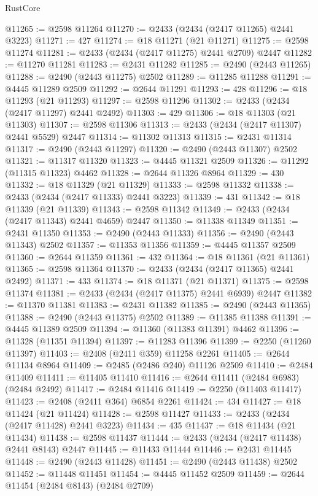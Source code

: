 \begin{lexlean}{RustCore}
\begin{coremodule}
@11265 := @2598 @11264
@11270 := @2433 (@2434 (@2417 @11265) @2441 @3223)
@11271 := 427
@11274 := @18 @11271 (@21 @11271)
@11275 := @2598 @11274
@11281 := @2433 (@2434 (@2417 @11275) @2441 @2709) @2447
@11282 := @11270 @11281
@11283 := @2431 @11282
@11285 := @2490 (@2443 @11265)
@11288 := @2490 (@2443 @11275) @2502
@11289 := @11285 @11288
@11291 := @4445 @11289 @2509
@11292 := @2644 @11291
@11293 := 428
@11296 := @18 @11293 (@21 @11293)
@11297 := @2598 @11296
@11302 := @2433 (@2434 (@2417 @11297) @2441 @2492)
@11303 := 429
@11306 := @18 @11303 (@21 @11303)
@11307 := @2598 @11306
@11313 := @2433 (@2434 (@2417 @11307) @2441 @5529) @2447
@11314 := @11302 @11313
@11315 := @2431 @11314
@11317 := @2490 (@2443 @11297)
@11320 := @2490 (@2443 @11307) @2502
@11321 := @11317 @11320
@11323 := @4445 @11321 @2509
@11326 := @11292 (@11315 @11323) @4462
@11328 := @2644 @11326 @8964
@11329 := 430
@11332 := @18 @11329 (@21 @11329)
@11333 := @2598 @11332
@11338 := @2433 (@2434 (@2417 @11333) @2441 @3223)
@11339 := 431
@11342 := @18 @11339 (@21 @11339)
@11343 := @2598 @11342
@11349 := @2433 (@2434 (@2417 @11343) @2441 @4659) @2447
@11350 := @11338 @11349
@11351 := @2431 @11350
@11353 := @2490 (@2443 @11333)
@11356 := @2490 (@2443 @11343) @2502
@11357 := @11353 @11356
@11359 := @4445 @11357 @2509
@11360 := @2644 @11359
@11361 := 432
@11364 := @18 @11361 (@21 @11361)
@11365 := @2598 @11364
@11370 := @2433 (@2434 (@2417 @11365) @2441 @2492)
@11371 := 433
@11374 := @18 @11371 (@21 @11371)
@11375 := @2598 @11374
@11381 := @2433 (@2434 (@2417 @11375) @2441 @6939) @2447
@11382 := @11370 @11381
@11383 := @2431 @11382
@11385 := @2490 (@2443 @11365)
@11388 := @2490 (@2443 @11375) @2502
@11389 := @11385 @11388
@11391 := @4445 @11389 @2509
@11394 := @11360 (@11383 @11391) @4462
@11396 := @11328 (@11351 @11394)
@11397 := @11283 @11396
@11399 := @2250 (@11260 @11397)
@11403 := @2408 (@2411 @359) @11258 @2261
@11405 := @2644 @11134 @8964
@11409 := @2485 (@2486 @240) @11126 @2509
@11410 := @2484 @11409
@11411 := @11405 @11410
@11416 := @2644 @11411 (@2484 @6983) (@2484 @2492)
@11417 := @2484 @11416
@11419 := @2250 (@11403 @11417)
@11423 := @2408 (@2411 @364) @6854 @2261
@11424 := 434
@11427 := @18 @11424 (@21 @11424)
@11428 := @2598 @11427
@11433 := @2433 (@2434 (@2417 @11428) @2441 @3223)
@11434 := 435
@11437 := @18 @11434 (@21 @11434)
@11438 := @2598 @11437
@11444 := @2433 (@2434 (@2417 @11438) @2441 @8143) @2447
@11445 := @11433 @11444
@11446 := @2431 @11445
@11448 := @2490 (@2443 @11428)
@11451 := @2490 (@2443 @11438) @2502
@11452 := @11448 @11451
@11454 := @4445 @11452 @2509
@11459 := @2644 @11454 (@2484 @8143) (@2484 @2709)

\end{coremodule}
\end{lexlean}
